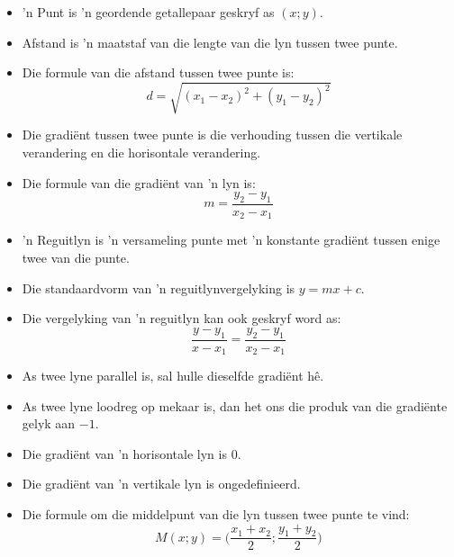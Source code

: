 \clearpage
\summary{}
\begin{itemize}[noitemsep]
\item 'n Punt is 'n geordende getallepaar geskryf as $(x;y)$.
\item Afstand is 'n maatstaf van die lengte van die lyn tussen twee punte.
\item Die formule van die afstand tussen twee punte is: 
\begin{equation*}
d=\sqrt{{({x}_{1}-{x}_{2})}^{2}+{({y}_{1}-{y}_{2})}^{2}}
\end{equation*}
\item Die gradi\"ent tussen twee punte is die verhouding tussen die vertikale verandering en die horisontale verandering.

\item Die formule van die gradiënt van ’n lyn is: 
\begin{equation*}
m=\frac{{y}_{2}-{y}_{1}}{{x}_{2}-{x}_{1}}
\end{equation*}
\item 'n Reguitlyn is 'n versameling punte met 'n konstante gradi\"ent tussen enige twee van die punte.
\item Die standaardvorm van 'n reguitlynvergelyking is $y=mx+c$.
\item Die vergelyking van 'n reguitlyn kan ook geskryf word as:
\begin{equation*}
\dfrac{y-y_1}{x-x_1}=\dfrac{y_2-y_1}{x_2-x_1}\end{equation*}
\item As twee lyne parallel is, sal hulle dieselfde gradiënt hê.
\item As twee lyne loodreg op mekaar is,
dan het ons die produk van die gradi\"ente gelyk aan $-1$.
\item Die gradi\"ent van 'n horisontale lyn is $0$.
\item Die gradi\"ent van 'n vertikale lyn is ongedefinieerd.
\item Die formule om die middelpunt van die lyn tussen twee punte te vind: 
\begin{equation*}
M(x;y) = \Big(\frac{{x}_{1}+{x}_{2}}{2};\frac{{y}_{1}+{y}_{2}}{2}\Big)
\end{equation*}
\end{itemize}


